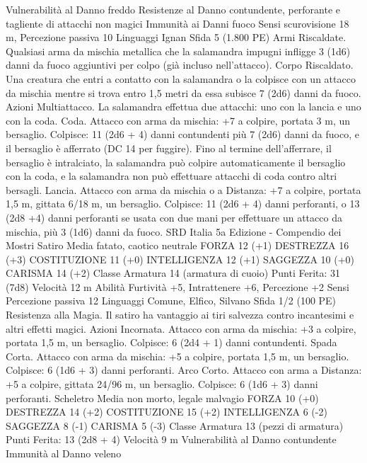 \begin{multicols}{2}
Vulnerabilità al Danno freddo
Resistenze al Danno contundente, perforante e tagliente di
attacchi non magici
Immunità ai Danni fuoco
Sensi scurovisione 18 m, Percezione passiva 10
Linguaggi Ignan
Sfida 5 (1.800 PE)
Armi Riscaldate. Qualsiasi arma da mischia metallica che la
salamandra impugni infligge 3 (1d6) danni da fuoco aggiuntivi
per colpo (già incluso nell’attacco).
Corpo Riscaldato. Una creatura che entri a contatto con la
salamandra o la colpisce con un attacco da mischia mentre si
trova entro 1,5 metri da essa subisce 7 (2d6) danni da fuoco.
Azioni
Multiattacco. La salamandra effettua due attacchi: uno con la
lancia e uno con la coda.
Coda. Attacco con arma da mischia: +7 a colpire, portata 3 m,
un bersaglio.
Colpisce: 11 (2d6 + 4) danni contundenti più 7 (2d6) danni da
fuoco, e il bersaglio è afferrato (DC 14 per fuggire). Fino al
termine dell’afferrare, il bersaglio è intralciato, la salamandra
può colpire automaticamente il bersaglio con la coda, e la
salamandra non può effettuare attacchi di coda contro altri
bersagli.
Lancia. Attacco con arma da mischia o a Distanza: +7 a colpire,
portata 1,5 m, gittata 6/18 m, un bersaglio.
Colpisce: 11 (2d6 + 4) danni perforanti, o 13 (2d8 +4) danni
perforanti se usata con due mani per effettuare un attacco da
mischia, più 3 (1d6) danni da fuoco.
SRD Italia 5a Edizione - Compendio dei Mostri
Satiro
Media fatato, caotico neutrale
FORZA 12 (+1)
DESTREZZA 16 (+3)
COSTITUZIONE 11 (+0)
INTELLIGENZA 12 (+1)
SAGGEZZA 10 (+0)
CARISMA 14 (+2)
Classe Armatura 14 (armatura di cuoio)
\hspace*{0pt}\hfill{Punti Ferita}: 31 (7d8)
Velocità 12 m
Abilità Furtività +5, Intrattenere +6, Percezione +2
Sensi Percezione passiva 12
Linguaggi Comune, Elfico, Silvano
Sfida 1/2 (100 PE)
Resistenza alla Magia. Il satiro ha vantaggio ai tiri salvezza
contro incantesimi e altri effetti magici.
Azioni
Incornata. Attacco con arma da mischia: +3 a colpire, portata
1,5 m, un bersaglio.
Colpisce: 6 (2d4 + 1) danni contundenti.
Spada Corta. Attacco con arma da mischia: +5 a colpire, portata
1,5 m, un bersaglio.
Colpisce: 6 (1d6 + 3) danni perforanti.
Arco Corto. Attacco con arma a Distanza: +5 a colpire, gittata
24/96 m, un bersaglio.
Colpisce: 6 (1d6 + 3) danni perforanti.
Scheletro
Media non morto, legale malvagio
FORZA 10 (+0)
DESTREZZA 14 (+2)
COSTITUZIONE 15 (+2)
INTELLIGENZA 6 (-2)
SAGGEZZA 8 (-1)
CARISMA 5 (-3)
Classe Armatura 13 (pezzi di armatura)
\hspace*{0pt}\hfill{Punti Ferita}: 13 (2d8 + 4)
Velocità 9 m
Vulnerabilità al Danno contundente
Immunità al Danno veleno

\end{multicols}
